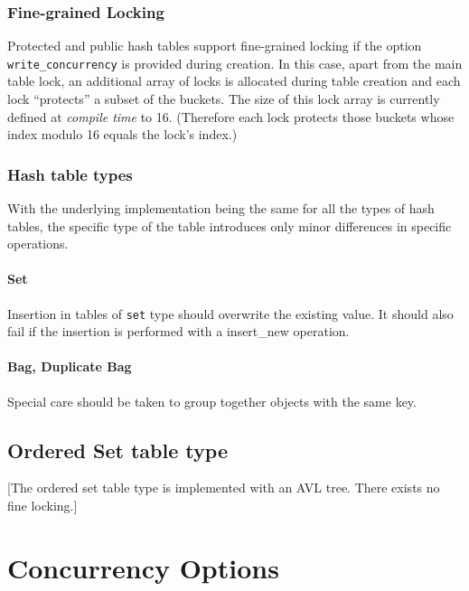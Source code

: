 \documentclass[aps,pre,preprint,nofootinbib]{revtex4}
\begin{document}
\subsubsection{Fine-grained Locking}

Protected and public hash tables support fine-grained locking if the option \verb|write_concurrency| is provided during creation.
In this case, apart from the main table lock, an additional array of locks is allocated during table creation and each lock ``protects'' a subset of the buckets.
The size of this lock array is currently defined at \emph{compile time} to 16.
(Therefore each lock protects those buckets whose index modulo 16 equals the lock's index.)


\subsubsection{Hash table types}     %

With the underlying implementation being the same for all the types of hash tables, the specific type of the table introduces only minor differences in specific operations.

\paragraph{Set}

Insertion in tables of \verb|set| type should overwrite the existing value.
It should also fail if the insertion is performed with a insert\_new operation.

\paragraph{Bag, Duplicate Bag}

Special care should be taken to group together objects with the same key.

\subsection{Ordered Set table type}

[The ordered set table type is implemented with an AVL tree.
There exists no fine locking.]

\section{Concurrency Options} \label{sec:concurrency_options}
\end{document}
